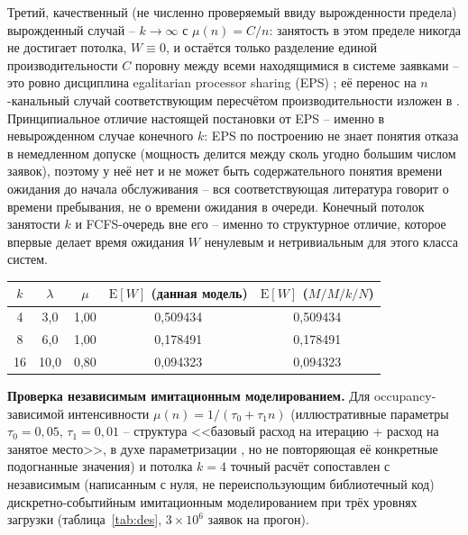 \documentclass[12pt,a4paper]{article}
\newcommand{\articlesection}[1]{\par\vspace{14pt}{\bfseries #1}\par\vspace{6pt}\nopagebreak}
\begin{document}
Третий, качественный (не численно проверяемый ввиду вырожденности предела) вырожденный случай -- $k\to\infty$ с $\mu(n)=C/n$: занятость в этом пределе никогда не достигает потолка, $W\equiv 0$, и остаётся только разделение единой производительности $C$ поровну между всеми находящимися в системе заявками -- это ровно дисциплина egalitarian processor sharing (EPS) \cite{yashkov1987}; её перенос на $n$-канальный случай соответствующим пересчётом производительности изложен в \cite{ryzhikov2018}. Принципиальное отличие настоящей постановки от EPS -- именно в невырожденном случае конечного $k$: EPS по построению не знает понятия отказа в немедленном допуске (мощность делится между сколь угодно большим числом заявок), поэтому у неё нет и не может быть содержательного понятия времени ожидания до начала обслуживания -- вся соответствующая литература говорит о времени пребывания, не о времени ожидания в очереди. Конечный потолок занятости $k$ и FCFS-очередь вне его -- именно то структурное отличие, которое впервые делает время ожидания $W$ ненулевым и нетривиальным для этого класса систем.

\begin{center}
\label{tab:regression}

\begin{tabular}{|c|c|c|c|c|}
\hline
$k$ & $\lambda$ & $\mu$ & $\mathrm{E}[W]$ (данная модель) & $\mathrm{E}[W]$ ($M/M/k/N$) \\
\hline
4  & 3,0  & 1,00 & 0,509434 & 0,509434 \\
8  & 6,0  & 1,00 & 0,178491 & 0,178491 \\
16 & 10,0 & 0,80 & 0,094323 & 0,094323 \\
\hline
\end{tabular}
\end{center}

\articlesection{Численные эксперименты}

\noindent\textbf{Проверка независимым имитационным моделированием.} Для occupancy-зависимой интенсивности $\mu(n)=1/(\tau_0+\tau_1 n)$ (иллюстративные параметры $\tau_0=0{,}05$, $\tau_1=0{,}01$ -- структура <<базовый расход на итерацию + расход на занятое место>>, в духе параметризации \cite{ramani2026}, но не повторяющая её конкретные подогнанные значения) и потолка $k=4$ точный расчёт сопоставлен с независимым (написанным с нуля, не переиспользующим библиотечный код) дискретно-событийным имитационным моделированием при трёх уровнях загрузки (таблица~\ref{tab:des}, $3\times10^6$ заявок на прогон).
\end{document}
